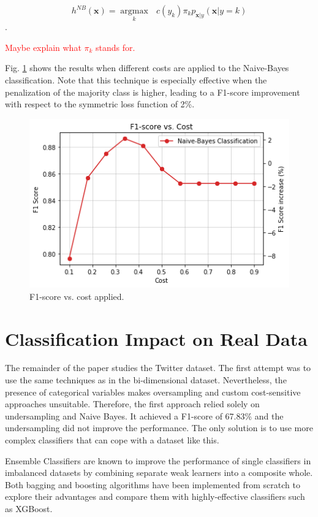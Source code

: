 \documentclass[conference]{IEEEtran}
\begin{document}
	$$ h^{NB}(\boldsymbol x) = \underset{k}{\operatorname{argmax}} \text{ } c(y_k) \pi_k p_{\boldsymbol x | y}(\boldsymbol x|y=k)$$.

\textcolor{red}{Maybe explain what $\pi_k$ stands for.}
	
	Fig. \ref{fig:CostSensitive} shows the results when different costs are applied to the Naive-Bayes classification. Note that this technique is especially effective when the penalization of the majority class is higher, leading to a F1-score improvement with respect to the symmetric loss function of 2\%.
	
	\begin{figure}[h]
		\includegraphics[scale=0.45]{pictures/cost-sensitive-dataset1.png}
		\centering
		\caption{F1-score vs. cost applied.}
		\label{fig:CostSensitive}
	\end{figure}

\section{Classification Impact on Real Data}
The remainder of the paper studies the Twitter dataset. The first attempt was to use the same techniques as in the bi-dimensional dataset. Nevertheless, the presence of categorical variables makes oversampling and custom cost-sensitive approaches unsuitable. Therefore, the first approach relied solely on undersampling and Naive Bayes. It achieved a F1-score of 67.83\% and the undersampling did not improve the performance. The only solution is to use more complex classifiers that can cope with a dataset like this.

Ensemble Classifiers are known to improve the performance of single classifiers in imbalanced datasets \cite{ensembles_review} by combining separate weak learners into a composite whole. Both bagging and boosting algorithms have been implemented from scratch to explore their advantages and compare them with highly-effective classifiers such as XGBoost.
\end{document}
